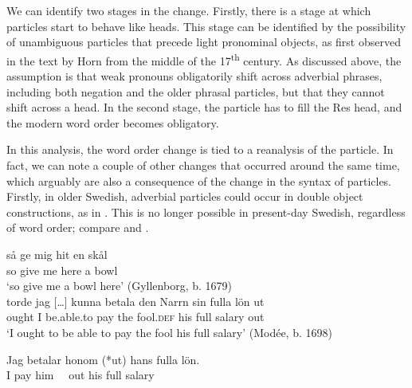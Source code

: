 \documentclass[output=paper]{langscibook}
\begin{document}
We can identify two stages in the change. Firstly, there is a stage at which particles start to behave like heads. This stage can be identified by the possibility of unambiguous particles that precede light pronominal objects, as first observed in the text by Horn from the middle of the 17\textsuperscript{th} century. As discussed above, the assumption is that weak pronouns obligatorily shift across adverbial phrases, including both negation and the older phrasal particles, but that they cannot shift across a head. In the second stage, the particle has to fill the Res head, and the modern word order becomes obligatory. 



In this analysis, the word order change is tied to a reanalysis of the particle. In fact, we can note a couple of other changes that occurred around the same time, which arguably are also a consequence of the change in the syntax of particles. Firstly, in older Swedish, adverbial particles could occur in double object constructions, as in . This is no longer possible in present-day Swedish, regardless of word order; compare  and .


\ea\label{ex:lalu:58}
\ea
\gll  så   ge     mig     hit  en   skål  \\
 so   give     me     here   a     bowl \\
\glt `so give me a bowl here’ (Gyllenborg, b. 1679)\\

\ex
\gll  torde  jag […]  kunna     betala   den   Narrn     sin   fulla   lön   ut \\
      ought  I   {}    be.able.to  pay     the   fool\textsc{.def}   his   full   salary   out\\
\glt `I ought to be able to pay the fool his full salary’ (Modée, b. 1698)\\
\z
\ex\label{ex:lalu:59}

\ex
\gll  Jag   betalar   honom   (*ut)   hans   fulla   lön.  \\
    I       pay     him       ~~out   his   full   salary\\
\z
\ex\label{ex:lalu:60}
\z
\z
\end{document}
